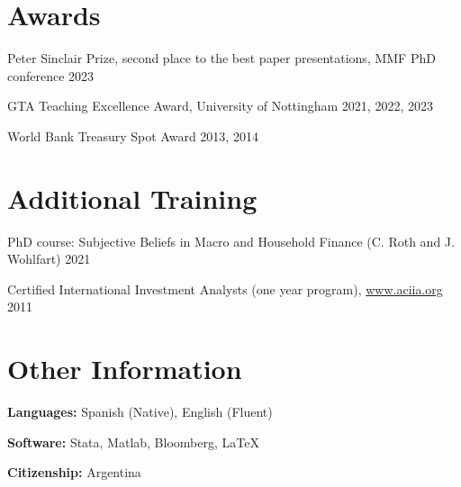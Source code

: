 \documentclass[11pt,letterpaper]{article}%
\begin{document}
\section*{Awards}
\vspace{-0.2cm}
\begin{list}{}{} 
\itemindent=-15pt
\setlength\itemsep{-0.1cm}
\item Peter Sinclair Prize, second place to the best paper presentations, MMF PhD conference  \hfill {2023} 
\item GTA Teaching Excellence Award, University of Nottingham  \hfill {2021, 2022, 2023}
\item World Bank Treasury Spot Award \hfill {2013, 2014}
\end{list}	


\section*{Additional Training}
\vspace{-0.2cm}
\begin{list}{}{} 
\setlength\itemsep{-0.1cm}
\itemindent=-15pt
 \item PhD course: Subjective Beliefs in Macro and Household Finance (C. Roth and J. Wohlfart) \hfill {2021} 
\item Certified International Investment Analysts (one year program), \href{http://www.aciia.org}{www.aciia.org} \hfill {2011} 
\end{list}	



\section*{Other Information}
\vspace{-0.2cm}
\begin{list}{}{} 
\itemindent=-15pt
\setlength\itemsep{-0.5cm}
\item \textbf{Languages:} Spanish (Native), English (Fluent) \\ 
\item \textbf{Software:} Stata, Matlab, Bloomberg, LaTeX\\ \item \textbf{Citizenship:} Argentina 
\end{list}	
\end{document}
